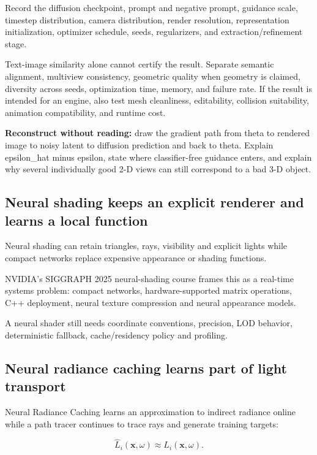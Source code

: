 Record the diffusion checkpoint, prompt and negative prompt, guidance scale, timestep distribution, camera distribution, render resolution, representation initialization, optimizer schedule, seeds, regularizers, and extraction/refinement stage.

Text-image similarity alone cannot certify the result. Separate semantic alignment, multiview consistency, geometric quality when geometry is claimed, diversity across seeds, optimization time, memory, and failure rate. If the result is intended for an engine, also test mesh cleanliness, editability, collision suitability, animation compatibility, and runtime cost.

\textbf{Reconstruct without reading:} draw the gradient path from theta to rendered image to noisy latent to diffusion prediction and back to theta. Explain epsilon\_hat minus epsilon, state where classifier-free guidance enters, and explain why several individually good 2-D views can still correspond to a bad 3-D object.

\subsection{Neural shading keeps an explicit renderer and learns a local function}\label{neural-shading-keeps-an-explicit-renderer-and-learns-a-local-function}

Neural shading can retain triangles, rays, visibility and explicit lights while compact networks replace expensive appearance or shading functions.

NVIDIA's SIGGRAPH 2025 neural-shading course frames this as a real-time systems problem: compact networks, hardware-supported matrix operations, C++ deployment, neural texture compression and neural appearance models.

A neural shader still needs coordinate conventions, precision, LOD behavior, deterministic fallback, cache/residency policy and profiling.

\subsection{Neural radiance caching learns part of light transport}\label{neural-radiance-caching-learns-part-of-light-transport}

Neural Radiance Caching learns an approximation to indirect radiance online while a path tracer continues to trace rays and generate training targets:

\[
\hat L_i(\mathbf x,\omega)\approx L_i(\mathbf x,\omega).
\]

